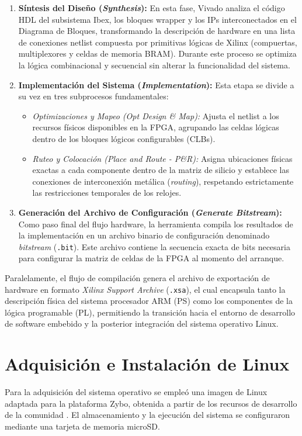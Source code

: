 \begin{enumerate}
    \item \textbf{Síntesis del Diseño (\textit{Synthesis}):} En esta fase, Vivado analiza el código HDL del subsistema Ibex, los bloques wrapper y los IPs interconectados en el Diagrama de Bloques, transformando la descripción de hardware en una lista de conexiones netlist compuesta por primitivas lógicas de Xilinx (compuertas, multiplexores y celdas de memoria BRAM). Durante este proceso se optimiza la lógica combinacional y secuencial sin alterar la funcionalidad del sistema.
    \item \textbf{Implementación del Sistema (\textit{Implementation}):} Esta etapa se divide a su vez en tres subprocesos fundamentales:
    \begin{itemize}
        \item \textit{Optimizaciones y Mapeo (\textit{Opt Design \& Map}):} Ajusta el netlist a los recursos físicos disponibles en la FPGA, agrupando las celdas lógicas dentro de los bloques lógicos configurables (CLBs).
        \item \textit{Ruteo y Colocación (\textit{Place and Route - P\&R}):} Asigna ubicaciones físicas exactas a cada componente dentro de la matriz de silicio y establece las conexiones de interconexión metálica (\textit{routing}), respetando estrictamente las restricciones temporales de los relojes.
    \end{itemize}
    \item \textbf{Generación del Archivo de Configuración (\textit{Generate Bitstream}):} Como paso final del flujo hardware, la herramienta compila los resultados de la implementación en un archivo binario de configuración denominado \textit{bitstream} (\texttt{.bit}). Este archivo contiene la secuencia exacta de bits necesaria para configurar la matriz de celdas de la FPGA al momento del arranque.
\end{enumerate}

Paralelamente, el flujo de compilación genera el archivo de exportación de hardware en formato \textit{Xilinx Support Archive} (\texttt{.xsa}), el cual encapsula tanto la descripción física del sistema procesador ARM (PS) como los componentes de la lógica programable (PL), permitiendo la transición hacia el entorno de desarrollo de software embebido y la posterior integración del sistema operativo Linux.

\section{Adquisición e Instalación de Linux}
Para la adquisición del sistema operativo se empleó una imagen de Linux adaptada para la plataforma Zybo, obtenida a partir de los recursos de desarrollo de la comunidad \cite{miscircuitos_zybo_linux}. El almacenamiento y la ejecución del sistema se configuraron mediante una tarjeta de memoria microSD.

